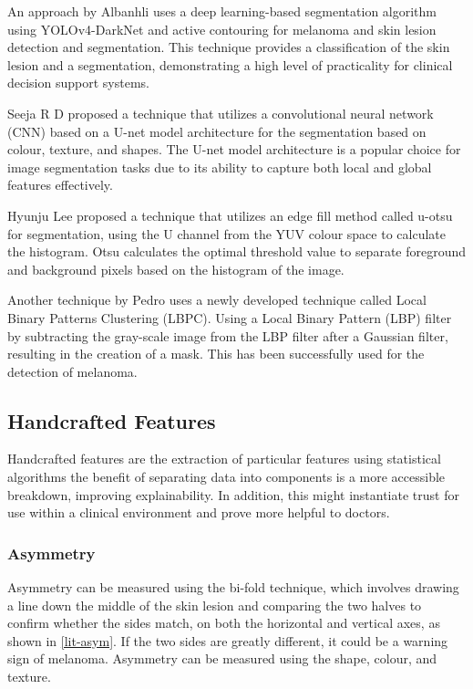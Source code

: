 An approach by Albanhli\cite{Albahli2020} uses a deep learning-based segmentation algorithm using YOLOv4-DarkNet and active contouring for melanoma and skin lesion detection and segmentation. This technique provides a classification of the skin lesion and a segmentation, demonstrating a high level of practicality for clinical decision support systems. 

Seeja R D\cite{seeja2019} proposed a technique that utilizes a convolutional neural network (CNN) based on a U-net model architecture for the segmentation based on colour, texture, and shapes. The U-net model architecture is a popular choice for image segmentation tasks due to its ability to capture both local and global features effectively.

Hyunju Lee\cite{Lee2020} proposed a technique that utilizes an edge fill method called u-otsu for segmentation, using the U channel from the YUV colour space to calculate the histogram. Otsu calculates the optimal threshold value to separate foreground and background pixels based on the histogram of the image.

Another technique by Pedro\cite{Pereira2020} uses a newly developed technique called Local Binary Patterns Clustering (LBPC). Using a Local Binary Pattern (LBP) filter by subtracting the gray-scale image from the LBP filter after a Gaussian filter, resulting in the creation of a mask. This has been successfully used for the detection of melanoma.

\subsection{Handcrafted Features}
Handcrafted features are the extraction of particular features using statistical algorithms the benefit of separating data into components is a more accessible breakdown, improving explainability. In addition, this might instantiate trust for use within a clinical environment and prove more helpful to doctors.

\subsubsection{Asymmetry}
Asymmetry can be measured using the bi-fold technique, which involves drawing a line down the middle of the skin lesion and comparing the two halves to confirm whether the sides match, on both the horizontal and vertical axes, as shown in \ref{lit-asym}. If the two sides are greatly different, it could be a warning sign of melanoma. Asymmetry can be measured using the shape\cite{Zaqout2016}, colour\cite{Kasmi2016}, and texture\cite{Ali2020a}.

